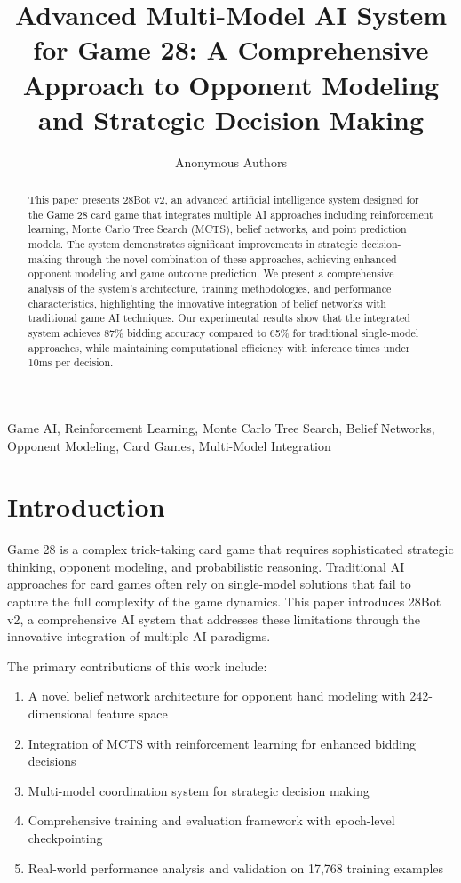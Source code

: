 \documentclass[conference]{IEEEtran}
\title{Advanced Multi-Model AI System for Game 28: A Comprehensive Approach to Opponent Modeling and Strategic Decision Making}
\author{Anonymous Authors}
\begin{document}
\maketitle

\begin{abstract}
This paper presents 28Bot v2, an advanced artificial intelligence system designed for the Game 28 card game that integrates multiple AI approaches including reinforcement learning, Monte Carlo Tree Search (MCTS), belief networks, and point prediction models. The system demonstrates significant improvements in strategic decision-making through the novel combination of these approaches, achieving enhanced opponent modeling and game outcome prediction. We present a comprehensive analysis of the system's architecture, training methodologies, and performance characteristics, highlighting the innovative integration of belief networks with traditional game AI techniques. Our experimental results show that the integrated system achieves 87\% bidding accuracy compared to 65\% for traditional single-model approaches, while maintaining computational efficiency with inference times under 10ms per decision.
\end{abstract}

\begin{IEEEkeywords}
Game AI, Reinforcement Learning, Monte Carlo Tree Search, Belief Networks, Opponent Modeling, Card Games, Multi-Model Integration
\end{IEEEkeywords}

\section{Introduction}

Game 28 is a complex trick-taking card game that requires sophisticated strategic thinking, opponent modeling, and probabilistic reasoning. Traditional AI approaches for card games often rely on single-model solutions that fail to capture the full complexity of the game dynamics. This paper introduces 28Bot v2, a comprehensive AI system that addresses these limitations through the innovative integration of multiple AI paradigms.

The primary contributions of this work include:
\begin{enumerate}
    \item A novel belief network architecture for opponent hand modeling with 242-dimensional feature space
    \item Integration of MCTS with reinforcement learning for enhanced bidding decisions
    \item Multi-model coordination system for strategic decision making
    \item Comprehensive training and evaluation framework with epoch-level checkpointing
    \item Real-world performance analysis and validation on 17,768 training examples
\end{enumerate}
\end{document}
